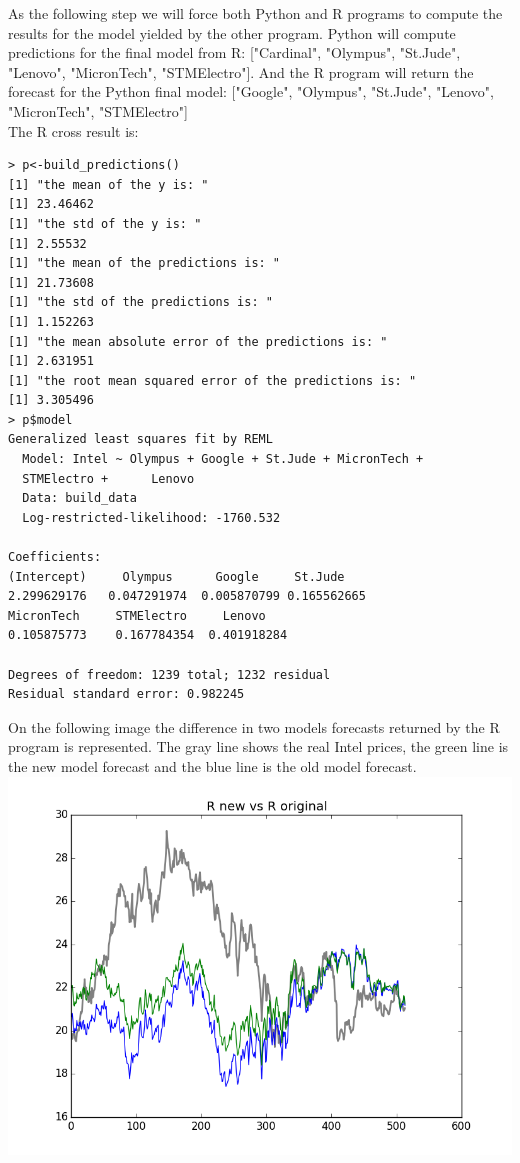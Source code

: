 \documentclass [twoside,
  11pt, a4paper,
  footinclude=true,
  headinclude=true,
  cleardoublepage=empty
]{article}
\begin{document}
As the following step we will force both Python and R programs to compute the results for the model yielded by the other program. Python will compute predictions for the final model from R: ["Cardinal", "Olympus", "St.Jude", "Lenovo", "MicronTech", "STMElectro"]. And the R program will return the forecast for the Python final model: ["Google", "Olympus", "St.Jude", "Lenovo", "MicronTech", "STMElectro"]\\
The R cross result is:
\begin{verbatim}
> p<-build_predictions()
[1] "the mean of the y is: "
[1] 23.46462
[1] "the std of the y is: "
[1] 2.55532
[1] "the mean of the predictions is: "
[1] 21.73608
[1] "the std of the predictions is: "
[1] 1.152263
[1] "the mean absolute error of the predictions is: "
[1] 2.631951
[1] "the root mean squared error of the predictions is: "
[1] 3.305496
> p$model
Generalized least squares fit by REML
  Model: Intel ~ Olympus + Google + St.Jude + MicronTech + 
  STMElectro +      Lenovo 
  Data: build_data 
  Log-restricted-likelihood: -1760.532

Coefficients:
(Intercept)     Olympus      Google     St.Jude  
2.299629176   0.047291974  0.005870799 0.165562665
MicronTech     STMElectro     Lenovo 
0.105875773    0.167784354  0.401918284 

Degrees of freedom: 1239 total; 1232 residual
Residual standard error: 0.982245 
\end{verbatim}
On the following image the difference in two models forecasts returned by the R program is represented. The gray line shows the real Intel prices, the green line is the new model forecast and the blue line is the old model forecast.\\
\includegraphics[scale=0.75]{ROriginalVsNew.png}\\
\end{document}
